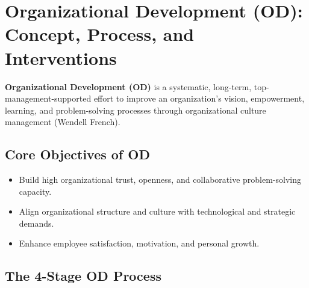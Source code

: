 \documentclass[11pt,a4paper]{article}
\begin{document}
\section{Organizational Development (OD): Concept, Process, and Interventions}

\begin{tcolorbox}[defbox, title={Definition of Organizational Development (OD)}]
  \textbf{Organizational Development (OD)} is a systematic, long-term, top-management-supported effort to improve an organization's vision, empowerment, learning, and problem-solving processes through organizational culture management (Wendell French).
\end{tcolorbox}

\subsection{Core Objectives of OD}
\begin{itemize}[leftmargin=*, itemsep=3pt]
  \item Build high organizational trust, openness, and collaborative problem-solving capacity.
  \item Align organizational structure and culture with technological and strategic demands.
  \item Enhance employee satisfaction, motivation, and personal growth.
\end{itemize}

\subsection{The 4-Stage OD Process}

\begin{tcolorbox}[tikzbox, title={The 4-Stage OD Process}]
\centering
{}
\end{tcolorbox}
\end{document}
